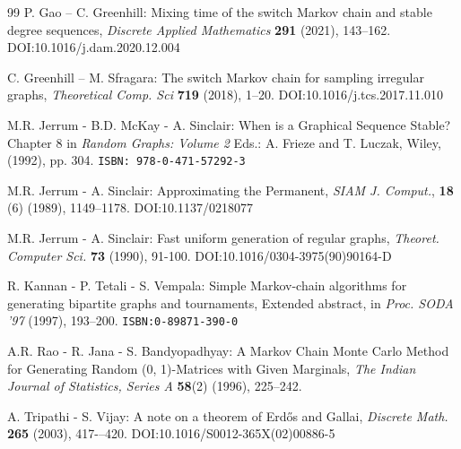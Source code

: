 \documentclass[11pt]{elsarticle}
\theoremstyle{plain}
\theoremstyle{definition}
\newcommand\DOI[1]{{DOI:#1}}
\begin{document}
\begin{thebibliography}{99}
 P. Gao -- C. Greenhill: Mixing time of the switch Markov chain and stable degree sequences, {\sl Discrete Applied Mathematics\/} {\bf 291} (2021), 143--162. \DOI{10.1016/j.dam.2020.12.004}

 C. Greenhill  -- M. Sfragara: The switch Markov chain for sampling irregular graphs, {\sl Theoretical Comp. Sci\/}  {\bf 719} (2018), 1--20. \DOI{10.1016/j.tcs.2017.11.010}

 M.R. Jerrum - B.D. McKay - A. Sinclair: When is a Graphical Sequence Stable? Chapter 8 in {\sl Random Graphs: Volume 2} Eds.: A. Frieze and T. Luczak, Wiley, (1992), pp. 304. {\tt ISBN: 978-0-471-57292-3}

 M.R. Jerrum - A. Sinclair: Approximating the Permanent, {\sl SIAM J. Comput.}, {\bf 18} (6) (1989), 1149–1178. \DOI{10.1137/0218077}

 M.R. Jerrum - A. Sinclair: Fast uniform generation of regular graphs, {\sl Theoret. Computer Sci.} {\bf 73} (1990), 91-100. \DOI{10.1016/0304-3975(90)90164-D}

 R. Kannan - P. Tetali - S. Vempala: Simple Markov-chain algorithms for generating bipartite graphs and tournaments, Extended abstract, in  {\sl Proc. SODA '97\/} (1997), 193--200. {\tt ISBN:0-89871-390-0}

 A.R. Rao - R. Jana - S. Bandyopadhyay: A Markov Chain Monte Carlo Method for Generating Random (0, 1)-Matrices with Given Marginals, {\sl The Indian Journal of Statistics, Series A} {\bf 58}(2) (1996), 225--242.


 A. Tripathi - S. Vijay: A note on a theorem of Erdős and Gallai, {\sl Discrete Math.} {\bf 265} (2003), 417-–420. \DOI{10.1016/S0012-365X(02)00886-5}




\end{thebibliography}
\end{document}
